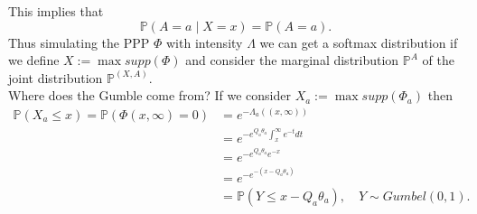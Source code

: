 \documentclass[A4,12pt,twoside]{book}
\begin{document}
This implies that
$$
\mathbb{P}(A=a \mid X=x)  = \mathbb{P}(A=a).
$$
Thus simulating the PPP $\Phi$ with intensity $\Lambda$ we can get a softmax distribution if we define $X:= \max supp (\Phi)$ and consider the marginal distribution $\mathbb{P}^A$ of the joint distribution $\mathbb{P}^{(X,A)}$.\\
Where does the Gumble come from? If we consider $X_a := \max supp (\Phi_a)$ then
\begin{align*}
    \mathbb{P}(X_a \leq x) = \mathbb{P}(\Phi(x,\infty) =0) &=e^{-\Lambda_a ((x,\infty))} \\
    &= e^{- e^{Q_a \theta_a} \int_x^\infty e^{-t} dt  } \\
    &= e^{- e^{Q_a \theta_a} e^{-x}  } \\
    &= e^{- e^{-(x-Q_a \theta_a)}  } \\
    &= \mathbb{P}(Y\leq x-Q_a \theta_a), \quad Y \sim Gumbel (0,1).
\end{align*}
\end{document}
